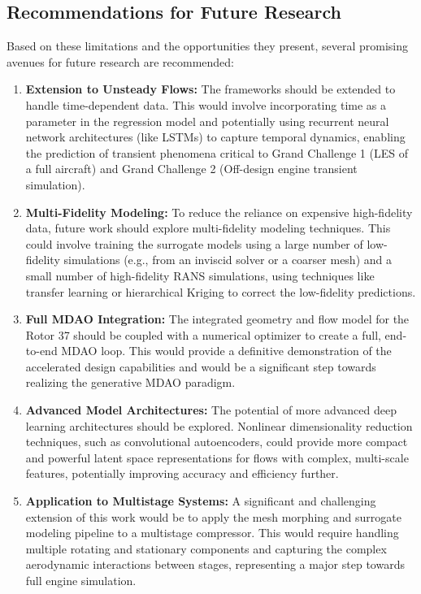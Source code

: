 \documentclass[12pt, a4paper]{report}
\begin{document}
\subsection{Recommendations for Future Research}
Based on these limitations and the opportunities they present, several promising avenues for future research are recommended:

\begin{enumerate}
    \item \textbf{Extension to Unsteady Flows:} The frameworks should be extended to handle time-dependent data. This would involve incorporating time as a parameter in the regression model and potentially using recurrent neural network architectures (like LSTMs) to capture temporal dynamics, enabling the prediction of transient phenomena critical to Grand Challenge 1 (LES of a full aircraft) and Grand Challenge 2 (Off-design engine transient simulation).
    \item \textbf{Multi-Fidelity Modeling:} To reduce the reliance on expensive high-fidelity data, future work should explore multi-fidelity modeling techniques. This could involve training the surrogate models using a large number of low-fidelity simulations (e.g., from an inviscid solver or a coarser mesh) and a small number of high-fidelity RANS simulations, using techniques like transfer learning or hierarchical Kriging to correct the low-fidelity predictions.
    \item \textbf{Full MDAO Integration:} The integrated geometry and flow model for the Rotor 37 should be coupled with a numerical optimizer to create a full, end-to-end MDAO loop. This would provide a definitive demonstration of the accelerated design capabilities and would be a significant step towards realizing the generative MDAO paradigm.
    \item \textbf{Advanced Model Architectures:} The potential of more advanced deep learning architectures should be explored. Nonlinear dimensionality reduction techniques, such as convolutional autoencoders, could provide more compact and powerful latent space representations for flows with complex, multi-scale features, potentially improving accuracy and efficiency further.
    \item \textbf{Application to Multistage Systems:} A significant and challenging extension of this work would be to apply the mesh morphing and surrogate modeling pipeline to a multistage compressor. This would require handling multiple rotating and stationary components and capturing the complex aerodynamic interactions between stages, representing a major step towards full engine simulation.
\end{enumerate}
\end{document}
